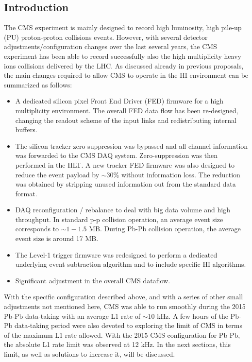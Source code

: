 \subsection{Introduction\label{subsec:HWintro}}
The CMS experiment is mainly designed to record high luminosity, high pile-up (PU) proton-proton collisions events.  However, with several detector adjustments/configuration changes over the last several years, the CMS experiment has been able to record successfully also the high multiplicity heavy ions collisions delivered by the LHC. As discussed already in previous
proposals, the main changes required to allow CMS to operate in the HI environment can be summarized as follows:

\begin{itemize}
\item A dedicated silicon pixel Front End Driver (FED) firmware for a high multiplicity environment. The overall FED data flow has been re-designed, changing the readout scheme of the input links and redistributing internal buffers.
 
\item The silicon tracker zero-suppression was bypassed and all channel information was forwarded to the CMS DAQ system. Zero-suppression was then performed in the HLT. A new tracker FED firmware was also designed to reduce the event payload by $\sim 30 \%$ without information loss. The reduction was obtained by stripping unused information out from the standard data format.  

\item DAQ reconfiguration / rebalance to deal with big data volume and high throughput. In standard p-p collision operation, an average event size corresponds to $\sim 1-1.5$ MB. During Pb-Pb collision operation, the average event size is around 17 MB. 

\item The Level-1 trigger firmware was redesigned to perform a dedicated underlying event subtraction algorithm and to include specific HI algorithms.

\item Significant adjustment in the overall CMS dataflow.
\end{itemize}


With the specific configuration described above, and with a series of other small adjustments not mentioned here, CMS was able to run smoothly during the 2015 Pb-Pb data-taking with an average L1 rate of $\sim 10$ kHz. A few hours of the Pb-Pb data-taking
period were also devoted to exploring the limit of CMS in terms of the maximum L1 rate allowed.  With the 2015 CMS configuration for Pb-Pb, the absolute L1 rate limit was observed at 12 kHz. In the next sections, this limit, as well as solutions to increase it, will be discussed. 

